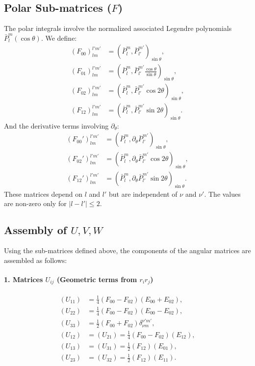 \documentclass[preprint,12pt]{elsarticle}
\begin{document}
\subsection{Polar Sub-matrices ($F$)}
The polar integrals involve the normalized associated Legendre polynomials $\bar{P}_l^m(\cos\theta)$. We define:
\begin{align}
    (F_{00})_{lm}^{l'm'} &= (\bar{P}_{l}^{m}, \bar{P}_{l'}^{m'})_{\sin\theta}, \\
    (F_{01})_{lm}^{l'm'} &= (\bar{P}_{l}^{m}, \bar{P}_{l'}^{m'} \frac{\cos\theta}{\sin\theta})_{\sin\theta}, \\
    (F_{02})_{lm}^{l'm'} &= (\bar{P}_{l}^{m}, \bar{P}_{l'}^{m'} \cos 2\theta)_{\sin\theta}, \\
    (F_{12})_{lm}^{l'm'} &= (\bar{P}_{l}^{m}, \bar{P}_{l'}^{m'} \sin 2\theta)_{\sin\theta}.
\end{align}
And the derivative terms involving $\partial_\theta$:
\begin{align}
    (F_{00}')_{lm}^{l'm'} &= (\bar{P}_{l}^{m}, \partial_\theta \bar{P}_{l'}^{m'})_{\sin\theta}, \\
    (F_{02}')_{lm}^{l'm'} &= (\bar{P}_{l}^{m}, \partial_\theta \bar{P}_{l'}^{m'} \cos 2\theta)_{\sin\theta}, \\
    (F_{12}')_{lm}^{l'm'} &= (\bar{P}_{l}^{m}, \partial_\theta \bar{P}_{l'}^{m'} \sin 2\theta)_{\sin\theta}.
\end{align}
These matrices depend on $l$ and $l'$ but are independent of $\nu$ and $\nu'$. The values are non-zero only for $|l-l'| \le 2$.

\subsection{Assembly of $U, V, W$}
Using the sub-matrices defined above, the components of the angular matrices are assembled as follows:

\paragraph{1. Matrices $U_{ij}$ (Geometric terms from $r_i r_j$)}
\begin{align*}
    (U_{11}) &= \frac{1}{4}(F_{00}-F_{02})(E_{00}+E_{02}), \\
    (U_{22}) &= \frac{1}{4}(F_{00}-F_{02})(E_{00}-E_{02}), \\
    (U_{33}) &= \frac{1}{2}(F_{00}+F_{02})\delta_{\nu m}^{\nu' m'}, \\
    (U_{12}) &= (U_{21}) = \frac{1}{4}(F_{00}-F_{02})(E_{12}), \\
    (U_{13}) &= (U_{31}) = \frac{1}{2}(F_{12})(E_{01}), \\
    (U_{23}) &= (U_{32}) = \frac{1}{2}(F_{12})(E_{11}).
\end{align*}
\end{document}

